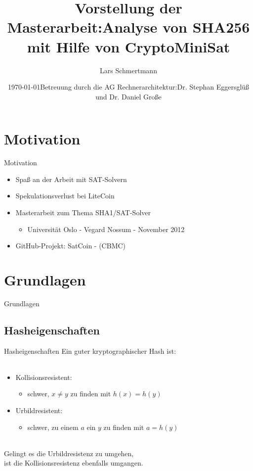 \documentclass{beamer}
\title[Analyse von SHA256 mit Hilfe von CryptoMiniSat]{Vorstellung der Masterarbeit:\newline Analyse von SHA256 mit Hilfe von CryptoMiniSat}
\author{Lars Schmertmann}
\date{\today\newline\newline\newline Betreuung durch die AG Rechnerarchitektur:\newline Dr. Stephan Eggersglüß und Dr. Daniel Große}
\begin{document}
\maketitle


\section{Motivation}
  \begin{frame}{Motivation}
    \begin{itemize}
      \setlength{\itemsep}{20pt}
      \item Spaß an der Arbeit mit SAT-Solvern
      \item Spekulationsverlust bei LiteCoin
      \item Masterarbeit zum Thema SHA1/SAT-Solver
      \begin{itemize}
        \item Universität Oslo - Vegard Nossum - November 2012
      \end{itemize}
      \item GitHub-Projekt: SatCoin - (CBMC)
    \end{itemize}
  \end{frame}
\section{Grundlagen}
  \begin{frame}{}
    \begin{center}
      \Huge Grundlagen
    \end{center}
  \end{frame}
  \subsection{Hasheigenschaften}
    \begin{frame}{Hasheigenschaften}
      Ein guter kryptographischer Hash ist:\\
      ~\\
      \begin{itemize}
        \setlength{\itemsep}{20pt}
        \item Kollisionsresistent:
        \begin{itemize}
          \item schwer, $ x \neq y $ zu finden mit $ h(x) = h(y) $
        \end{itemize}
        \item Urbildresistent:
        \begin{itemize}
          \item schwer, zu einem $ a $ ein $ y $ zu finden mit $ a = h(y) $
        \end{itemize}
      \end{itemize}
      ~\\
      Gelingt es die Urbildresistenz zu umgehen,\\
      ist die Kollisionsresistenz ebenfalls umgangen.
    \end{frame}
\end{document}
